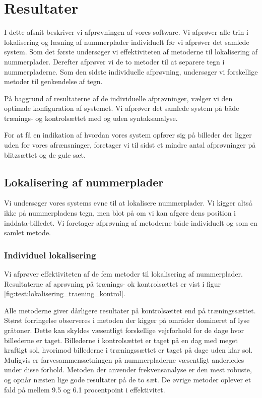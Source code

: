 \section{Resultater}
\label{sec:resultater}
I dette afsnit beskriver vi afprøvningen af vores software. Vi afprøver alle trin i lokalisering og læsning af nummerplader individuelt før vi afprøver det samlede system. Som det første undersøger vi effektiviteten af metoderne til lokalisering af nummerplader. Derefter afprøver vi de to metoder til at separere tegn i nummerpladerne. Som den sidste individuelle afprøvning, undersøger vi forskellige metoder til genkendelse af tegn.

På baggrund af resultaterne af de individuelle afprøvninger, vælger vi den optimale konfiguration af systemet. Vi afprøver det samlede system på både trænings- og kontrolsættet med og uden syntaksanalyse.

For at få en indikation af hvordan vores system opfører sig på billeder der ligger uden for vores afrænsninger, foretager vi til sidst et mindre antal afprøvninger på blitzsættet og de gule sæt.


\subsection{Lokalisering af nummerplader}
Vi undersøger vores systems evne til at lokalisere nummerplader. Vi kigger altså ikke på nummerpladens tegn, men blot på om vi kan afgøre dens position i inddata-billedet. Vi foretager afprøvning af metoderne både individuelt og som en samlet metode.

\subsubsection{Individuel lokalisering}
Vi afprøver effektiviteten af de fem metoder til lokalisering af nummerplader. Resultaterne af aprøvning på trænings- ok kontrolsættet er vist i figur \vref{fig:test:lokalisering_traening_kontrol}.

Alle metoderne giver dårligere resultater på kontrolsættet end på træningssættet. Størst forringelse observeres i metoden der kigger på områder domineret af lyse gråtoner. Dette kan skyldes væsentligt forskellige vejrforhold for de dage hvor billederne er taget. Billederne i kontrolsættet er taget på en dag med meget kraftigt sol, hvorimod billederne i træningssættet er taget på dage uden klar sol. Muligvis er farvesammensætningen på nummerpladerne væsentligt anderledes under disse forhold. Metoden der anvender frekvensanalyse er den mest robuste, og opnår næsten lige gode resultater på de to sæt. De øvrige metoder oplever et fald på mellem 9.5 og 6.1 procentpoint i effektivitet.

